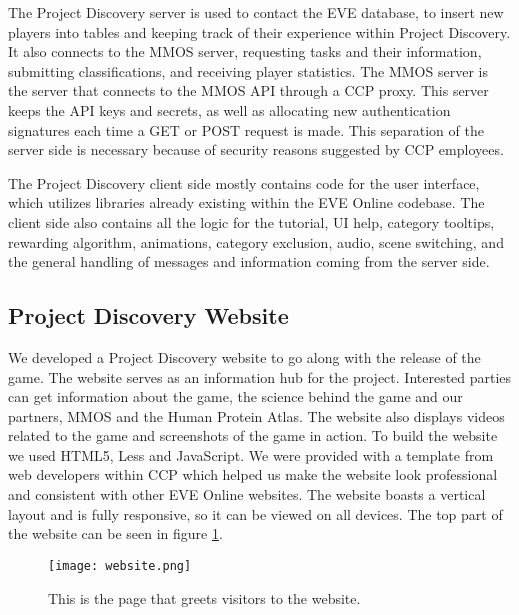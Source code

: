 	The Project Discovery server is used to contact the EVE database, to insert new players into tables and keeping track of their experience within Project Discovery. It also connects to the MMOS server, requesting tasks and their information, submitting classifications, and receiving player statistics. The MMOS server is the server that connects to the MMOS API through a CCP proxy. This server keeps the API keys and secrets, as well as allocating new authentication signatures each time a GET or POST request is made. This separation of the server side is necessary because of security reasons suggested by CCP employees.

	The Project Discovery client side mostly contains code for the user interface, which utilizes libraries already existing within the EVE Online codebase. The client side also contains all the logic for the tutorial, UI help, category tooltips, rewarding algorithm, animations, category exclusion, audio, scene switching, and the general handling of messages and information coming from the server side.

\subsection{Project Discovery Website}
	We developed a Project Discovery website to go along with the release of the game. The website serves as an information hub for the project. Interested parties can get information about the game, the science behind the game and our partners, MMOS and the Human Protein Atlas. The website also displays videos related to the game and screenshots of the game in action. To build the website we used HTML5, Less and JavaScript. We were provided with a template from web developers within CCP which helped us make the website look professional and consistent with other EVE Online websites. The website boasts a vertical layout and is fully responsive, so it can be viewed on all devices. The top part of the website can be seen in figure \ref{fig:website}.

	\begin{figure}[H]
	  \centering
	  \graphicspath{ {./graphics/} }
	  \centerline{\texttt{[image: website.png]}}
	  \caption{\label{fig:website} This is the page that greets visitors to the website.}
	\end{figure}
